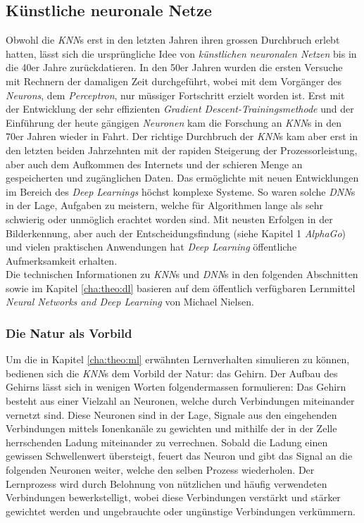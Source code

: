 \subsection[KNNs]{Künstliche neuronale Netze}
Obwohl die \textit{KNN}s erst in den letzten Jahren ihren grossen Durchbruch erlebt hatten, lässt sich die ursprüngliche Idee von \textit{künstlichen neuronalen Netzen} bis in die 40er Jahre zurückdatieren. In den 50er Jahren wurden die ersten Versuche mit Rechnern der damaligen Zeit durchgeführt, wobei mit dem Vorgänger des \textit{Neurons}, dem \textit{Perceptron}, nur müssiger Fortschritt erzielt worden ist. Erst mit der Entwicklung der sehr effizienten \textit{Gradient Descent-Trainingsmethode} und der Einführung der heute gängigen \textit{Neuronen} kam die Forschung an \textit{KNN}s in den 70er Jahren wieder in Fahrt. Der richtige Durchbruch der \textit{KNN}s kam aber erst in den letzten beiden Jahrzehnten mit der rapiden Steigerung der Prozessorleistung, aber auch dem Aufkommen des Internets und der schieren Menge an gespeicherten und zugänglichen Daten. Das ermöglichte mit neuen Entwicklungen im Bereich des \textit{Deep Learnings} höchst komplexe Systeme. So waren solche \textit{DNN}s in der Lage, Aufgaben zu meistern, welche für Algorithmen lange als sehr schwierig oder unmöglich erachtet worden sind. Mit neusten Erfolgen in der Bilderkennung, aber auch der Entscheidungsfindung (siehe Kapitel 1 \textit{AlphaGo}) und vielen praktischen Anwendungen hat \textit{Deep Learning} öffentliche Aufmerksamkeit erhalten\cite{ann}.\\

Die technischen Informationen zu \textit{KNN}s und \textit{DNN}s in den folgenden Abschnitten sowie im Kapitel \ref{cha:theo:dl} basieren auf dem öffentlich verfügbaren Lernmittel \textit{Neural Networks and Deep Learning} von Michael Nielsen\cite{nielsen}.

\subsubsection{Die Natur als Vorbild}
Um die in Kapitel \ref{cha:theo:ml} erwähnten Lernverhalten simulieren zu können, bedienen sich die \textit{KNN}s dem Vorbild der Natur: das Gehirn. Der Aufbau des Gehirns lässt sich in wenigen Worten folgendermassen formulieren: Das Gehirn besteht aus einer Vielzahl an Neuronen, welche durch  Verbindungen miteinander vernetzt sind. Diese Neuronen sind in der Lage, Signale aus den eingehenden Verbindungen mittels Ionenkanäle zu gewichten und mithilfe der in der Zelle herrschenden Ladung miteinander zu verrechnen. Sobald die Ladung einen gewissen Schwellenwert übersteigt, feuert das Neuron und gibt das Signal an die folgenden Neuronen weiter, welche den selben Prozess wiederholen. Der Lernprozess wird durch Belohnung von nützlichen und häufig verwendeten Verbindungen bewerkstelligt, wobei diese Verbindungen verstärkt und stärker gewichtet werden und ungebrauchte oder ungünstige Verbindungen verkümmern\cite{klett}.

